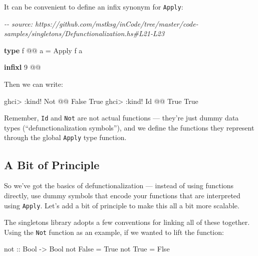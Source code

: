 \documentclass[]{article}
\newenvironment{Shaded}{}{}
\newcommand{\CommentTok}[1]{\textcolor[rgb]{0.38,0.63,0.69}{\textit{#1}}}
\newcommand{\DataTypeTok}[1]{\textcolor[rgb]{0.56,0.13,0.00}{#1}}
\newcommand{\DecValTok}[1]{\textcolor[rgb]{0.25,0.63,0.44}{#1}}
\newcommand{\FunctionTok}[1]{\textcolor[rgb]{0.02,0.16,0.49}{#1}}
\newcommand{\KeywordTok}[1]{\textcolor[rgb]{0.00,0.44,0.13}{\textbf{#1}}}
\newcommand{\NormalTok}[1]{#1}
\newcommand{\OperatorTok}[1]{\textcolor[rgb]{0.40,0.40,0.40}{#1}}
\newcommand{\OtherTok}[1]{\textcolor[rgb]{0.00,0.44,0.13}{#1}}
\begin{document}
It can be convenient to define an infix synonym for \texttt{Apply}:

\begin{Shaded}
\begin{Highlighting}[]
\CommentTok{{-}{-} source: https://github.com/mstksg/inCode/tree/master/code{-}samples/singletons/Defunctionalization.hs\#L21{-}L23}

\KeywordTok{type}\NormalTok{ f }\OperatorTok{@@}\NormalTok{ a }\OtherTok{=} \DataTypeTok{Apply}\NormalTok{ f a}

\KeywordTok{infixl} \DecValTok{9} \OperatorTok{@@}
\end{Highlighting}
\end{Shaded}

Then we can write:

\begin{Shaded}
\begin{Highlighting}[]
\NormalTok{ghci}\OperatorTok{\textgreater{}} \OperatorTok{:}\NormalTok{kind}\OperatorTok{!} \DataTypeTok{Not} \OperatorTok{@@} \DataTypeTok{\textquotesingle{}False}
\DataTypeTok{\textquotesingle{}True}
\NormalTok{ghci}\OperatorTok{\textgreater{}} \OperatorTok{:}\NormalTok{kind}\OperatorTok{!} \DataTypeTok{Id} \OperatorTok{@@} \DataTypeTok{\textquotesingle{}True}
\DataTypeTok{\textquotesingle{}True}
\end{Highlighting}
\end{Shaded}

Remember, \texttt{Id} and \texttt{Not} are not actual functions --- they're just
dummy data types (``defunctionalization symbols''), and we define the functions
they represent through the global \texttt{Apply} type function.

\subsection{A Bit of Principle}\label{a-bit-of-principle}

So we've got the basics of defunctionalization --- instead of using functions
directly, use dummy symbols that encode your functions that are interpreted
using \texttt{Apply}. Let's add a bit of principle to make this all a bit more
scalable.

The singletons library adopts a few conventions for linking all of these
together. Using the \texttt{Not} function as an example, if we wanted to lift
the function:

\begin{Shaded}
\begin{Highlighting}[]
\FunctionTok{not}\OtherTok{ ::} \DataTypeTok{Bool} \OtherTok{{-}\textgreater{}} \DataTypeTok{Bool}
\FunctionTok{not} \DataTypeTok{False} \OtherTok{=} \DataTypeTok{True}
\FunctionTok{not} \DataTypeTok{True}  \OtherTok{=} \DataTypeTok{Flse}
\end{Highlighting}
\end{Shaded}
\end{document}
